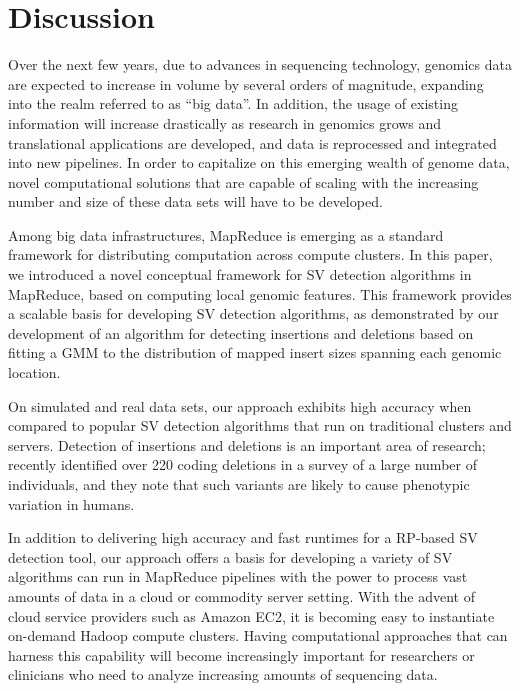 \documentclass{bioinfo}
\newcommand{\todo}[1]{}
\begin{document}
\section{Discussion}

Over the next few years, due to advances in sequencing technology, genomics data are expected to increase in volume by several orders of magnitude, expanding into the realm referred to as ``big data''. In addition, the usage of existing information will increase drastically as research in genomics grows and translational applications are developed, and data is reprocessed and integrated into new pipelines. In order to capitalize on this emerging wealth of genome data, novel computational solutions that are capable of scaling with the increasing number and size of these data sets will have to be developed. 

Among big data infrastructures, MapReduce is emerging as a standard framework for distributing computation across compute clusters. In this paper, we introduced a novel conceptual framework for SV detection algorithms in MapReduce, based on computing local genomic features. This framework provides a scalable basis for developing SV detection algorithms, as demonstrated by our development of an algorithm for detecting insertions and deletions based on fitting a GMM to the distribution of mapped insert sizes spanning each genomic location.

On simulated and real data sets, our approach exhibits high accuracy when compared to popular SV detection algorithms that run on traditional clusters and servers. Detection of insertions and deletions is an important area of research; \cite{Mills:2011fi} recently identified over 220 coding deletions in a survey of a large number of individuals, and they note that such variants are likely to cause phenotypic variation in humans. \todo{More SV annotations are also required to assess the impact of SVs on non-coding elements~\citep{Mu:2011br}.}

In addition to delivering high accuracy and fast runtimes for a RP-based SV detection tool, our approach offers a basis for developing a variety of SV algorithms can run in MapReduce pipelines with the power to process vast amounts of data in a cloud or commodity server setting. With the advent of cloud service providers such as Amazon EC2, it is becoming easy to instantiate on-demand Hadoop compute clusters. Having computational approaches that can harness this capability will become increasingly important for researchers or clinicians who need to analyze increasing amounts of sequencing data.
\end{document}
